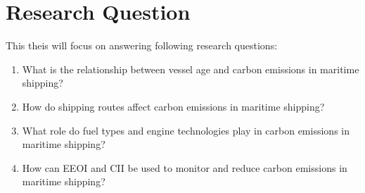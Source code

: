 \section{Research Question}

This theis will focus on answering following research questions:

\begin{enumerate}
    \item What is the relationship between vessel age and carbon emissions in maritime shipping?
    \item How do shipping routes affect carbon emissions in maritime shipping?
    \item What role do fuel types and engine technologies play in carbon emissions in maritime shipping?
    \item How can EEOI and CII be used to monitor and reduce carbon emissions in maritime shipping?
\end{enumerate}
